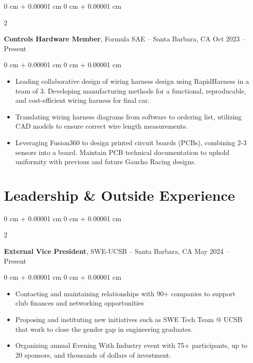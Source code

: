 \documentclass[10pt, letterpaper]{article}
\newenvironment{highlights}{
    \begin{itemize}[
        topsep=0.10 cm,
        parsep=0.10 cm,
        partopsep=0pt,
        itemsep=0pt,
        leftmargin=0 cm + 10pt
    ]
}{
    \end{itemize}
} %
\newenvironment{onecolentry}{
    \begin{adjustwidth}{
        0 cm + 0.00001 cm
    }{
        0 cm + 0.00001 cm
    }
}{
    \end{adjustwidth}
} %
\newenvironment{twocolentry}[2][]{
    \onecolentry
    \def\secondColumn{#2}
    \setcolumnwidth{\fill, 4.5 cm}
    \begin{paracol}{2}
}{
    \switchcolumn \raggedleft \secondColumn
    \end{paracol}
    \endonecolentry
} %
\begin{document}
        \vspace{0.2 cm}

    \vspace{0.2 cm}


    \begin{twocolentry}{
        Oct 2023 – Present
    }
    
    \textbf{Controls Hardware Member}, Formula SAE -- Santa Barbara, CA\end{twocolentry}

    \vspace{0.10 cm}
    \begin{onecolentry}
        \begin{highlights}
            \item Leading collaborative design of wiring harness design using RapidHarness in a team of 3. Developing manufacturing methods for a functional, reproducable, and cost-efficient wiring harness for final car.
            \item Translating wiring harness diagrams from software to ordering list, utilizing CAD models to ensure correct wire length measurements. 
            \item Leveraging Fusion360 to design printed circuit boards (PCBs), combining 2-3 sensors into a board. Maintain PCB technical documentation to uphold uniformity with previous and future Gaucho Racing designs.
        \end{highlights}
    \end{onecolentry}





    \section{Leadership \& Outside Experience}

        \begin{twocolentry}{
            May 2024 – Present
        }
            \textbf{External Vice President}, SWE-UCSB -- Santa Barbara, CA\end{twocolentry}

        \vspace{0.10 cm}
        \begin{onecolentry}
            \begin{highlights}
                \item Contacting and maintaining relationships with 90+ companies to support club finances and networking opportunities 
                \item Proposing and instituting new initiatives such as SWE Tech Team @ UCSB that work to close the gender gap in engineering graduates.
                \item Organizing annual Evening With Industry event with 75+ participants, up to 20 sponsors, and thousands of dollars of investment.
            \end{highlights}
        \end{onecolentry}
\end{document}
